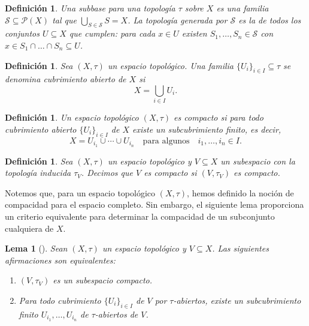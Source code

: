 \documentclass[12pt]{book}
\newtheorem{lemma}[theorem]{Lema}
\newtheorem{definition}[theorem]{Definición}
\begin{document}
\begin{definition}\label{def:subbase}
Una \emph{subbase} para una topología \( \tau \) sobre \( X \)
es una familia \( \mathscr{S}\subseteq\mathcal{P}(X) \)
tal que \( \bigcup_{S\in\mathscr{S}} S = X \).
La topología generada por \( \mathscr{S} \) es la de todos los conjuntos \( U\subseteq X \)
que cumplen:  
para cada \( x\in U \) existen \( S_1,\dots,S_n\in\mathscr{S} \)
con \( x\in S_1\cap\dots\cap S_n\subseteq U \).
\end{definition}

\begin{definition}\label{def:cubrimiento-abierto}
Sea $(X,\tau)$ un espacio topológico.  
Una familia $\{U_i\}_{i\in I}\subseteq\tau$ se denomina 
\emph{cubrimiento abierto} de $X$ si
\[
X = \bigcup_{i\in I} U_i.
\]
\end{definition}

\begin{definition}\label{def:compacidad}
Un espacio topológico $(X,\tau)$ es \emph{compacto} si 
para todo cubrimiento abierto $\{U_i\}_{i\in I}$ de $X$ 
existe un subcubrimiento finito, es decir,
\[
X = U_{i_1}\cup\cdots\cup U_{i_n}
\quad\text{para algunos}\quad i_1,\dots,i_n\in I.
\]
\end{definition}

\begin{definition}\label{def:compacidad-subespacio}
Sea $(X,\tau)$ un espacio topológico y $V\subseteq X$ un subespacio
con la topología inducida $\tau_V$.  
Decimos que $V$ es \emph{compacto} si $(V,\tau_V)$ es compacto.
\end{definition}

\medskip

Notemos que, para un espacio topológico $(X,\tau)$, hemos definido la noción de compacidad para el espacio completo.  
Sin embargo, el siguiente lema proporciona un criterio equivalente para determinar la compacidad de un subconjunto cualquiera de $X$.

\begin{lemma}[{\cite[Lema~26.1]{Munkres}}]\label{lem:compacto-subespacio-Munkres}
Sean $(X,\tau)$ un espacio topológico y $V \subseteq X$. Las siguientes afirmaciones son equivalentes:
\begin{enumerate}
    \item $(V,\tau_{V})$ es un subespacio compacto.
    \item Para todo cubrimiento $\{U_{i}\}_{i \in I}$ de $V$ por $\tau$-abiertos, 
    existe un subcubrimiento finito $U_{i_1},\dots,U_{i_n}$ de $\tau$-abiertos de $V$.
\end{enumerate}
\end{lemma}
\end{document}
